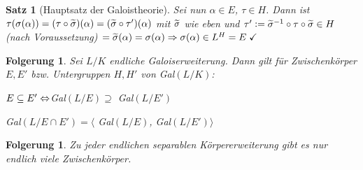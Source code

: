 \documentclass[a4paper,10pt,german]{scrbook}
\theoremstyle{saetze}
\newtheorem{Satz}{Satz}
\theoremstyle{definitionen}
\newtheorem{Folg}[Def]{Folgerung}
\begin{document}
\begin{Satz}[Hauptsatz der Galoistheorie]
{Sei nun $\alpha \in E$, $\tau \in H$. Dann ist $\tau(\sigma(\alpha))
= (\tau \circ \widetilde{\sigma})(\alpha) =
(\widetilde{\sigma}\circ\tau')(\alpha)$ mit $\widetilde{\sigma}$ wie eben und
$\tau' \mathrel{\mathop:}= \widetilde{\sigma}^{-1}\circ \tau \circ \widetilde{\sigma} \in H $
(nach Voraussetzung) $=\widetilde{\sigma}(\alpha) = \sigma(\alpha) \Rightarrow
\sigma(\alpha) \in L^H  = E\; \checkmark$}
\end{Satz}

\begin{Folg}
Sei $L/K$ endliche Galoiserweiterung. Dann
gilt für Zwischenkörper $E,E'$ bzw. Untergruppen $H,H'$ von
Gal$(L/K)$: \begin{enum}
\item $E \subseteq E' \Leftrightarrow $Gal$(L/E) \supseteq$ Gal$(L/E')$

\item Gal$(L/E \cap E') = \langle$ Gal$(L/E)$,
Gal$(L/E')\rangle$

\end{enum}
\end{Folg}

\begin{Folg}
Zu jeder endlichen separablen
Körpererweiterung gibt es nur endlich viele Zwischenkörper.

\end{Folg}
\end{document}
